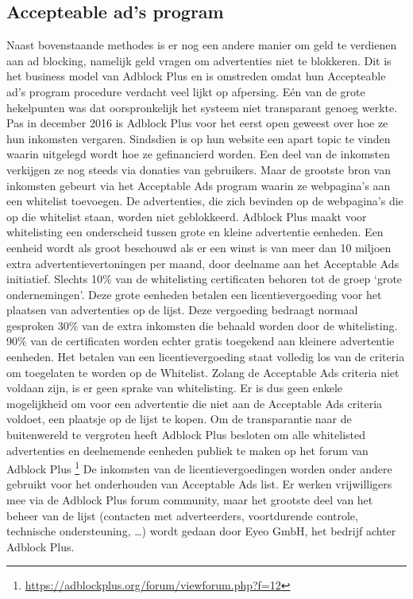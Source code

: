 \documentclass[pdftex,a4paper,12pt,twoside]{report}
\begin{document}
\subsection{ Accepteable ad's program}
\label{sec:Accepteable ad's program}
Naast bovenstaande methodes is er nog een andere manier om geld te verdienen aan ad blocking, namelijk geld vragen om advertenties niet te blokkeren. Dit is het business model van Adblock Plus en is omstreden omdat hun Accepteable ad's program procedure verdacht veel lijkt op afpersing. Eén van de grote hekelpunten was dat oorspronkelijk het systeem niet transparant genoeg werkte. Pas in december 2016 is Adblock Plus voor het eerst open geweest over hoe ze hun inkomsten vergaren. Sindsdien is op hun website een apart topic te vinden waarin uitgelegd wordt hoe ze gefinancierd worden. Een deel van de inkomsten verkijgen ze nog steeds via donaties van gebruikers.
Maar de grootste bron van inkomsten gebeurt via het Acceptable Ads program waarin ze webpagina's aan een whitelist toevoegen. De advertenties, die zich bevinden op de webpagina's die op die whitelist staan, worden niet geblokkeerd. 
Adblock Plus maakt voor whitelisting een onderscheid tussen grote en kleine advertentie eenheden. Een eenheid wordt als groot beschouwd als er een winst is van meer dan 10 miljoen extra advertentievertoningen per maand, door deelname aan het Acceptable Ads initiatief. Slechts 10\% van de whitelisting certificaten behoren tot de groep ‘grote ondernemingen’. Deze grote eenheden betalen een licentievergoeding voor het plaatsen van advertenties op de lijst. Deze vergoeding bedraagt normaal gesproken 30\% van de extra inkomsten die behaald worden door de whitelisting. 90\% van de certificaten worden echter gratis toegekend aan kleinere advertentie eenheden. Het betalen van een licentievergoeding staat volledig los van de criteria om toegelaten te worden op de Whitelist. Zolang de Acceptable Ads criteria niet voldaan zijn, is er geen sprake van whitelisting. Er is dus geen enkele mogelijkheid om voor een advertentie die niet aan de Acceptable Ads criteria voldoet, een plaatsje op de lijst te kopen. Om de transparantie naar de buitenwereld te vergroten heeft Adblock Plus besloten om alle whitelisted advertenties en deelnemende eenheden publiek te maken op het forum van Adblock Plus \footnote{\url{https://adblockplus.org/forum/viewforum.php?f=12}}
De inkomsten van de licentievergoedingen worden onder andere gebruikt voor het onderhouden van Acceptable Ads list. Er werken vrijwilligers mee via de Adblock Plus forum community, maar het grootste deel van het beheer van de lijst (contacten met adverteerders, voortdurende controle, technische ondersteuning, …) wordt gedaan  door Eyeo GmbH, het bedrijf achter Adblock Plus.
\end{document}

